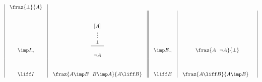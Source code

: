\begin{figure}[htbp]
\[\begin{array}{|c|c||c|c|}
\begin{array}{c}
	\fraz{\bot}
	     {A}
	\end{array}
	\\
	\begin{array}{l}
	\\ \\ \\ \\ \\
	\imp I_{\neg}  
	\end{array}
	& 
	\begin{array}{c}
	\\ \\
	{[A]}\\
	\vdots\\
	\bot\\
	\hline\\
	\neg A
	\end{array}
	&
	\begin{array}{l}
	\\ \\ \\ \\ \\
	\imp E_{\neg}  
	\end{array}
	& 
	\begin{array}{c}
	\\ \\ \\ \\ \\
	\fraz{A \ \ \neg A}
	     {\bot}
	\end{array}
	\\
	\begin{array}{l}
	\\ \\
	\liff  I  
	\end{array}
	& 
	\begin{array}{c}
	\\ \\ 
	\fraz{A \imp B \ \ B \imp A}
	     {A \liff B}
	\end{array}
	&
	\begin{array}{l}
	\\ \\
	\liff E  
	\end{array}
	& 
	\begin{array}{c}
	\\ \\
	\fraz{A \liff B}
	     {A \imp B}
	\end{array}
	\ \
	\begin{array}{c}

\end{array}
\end{array}\]
\end{figure}
